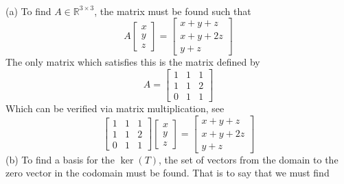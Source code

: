 \documentclass{report}
\begin{document}
\sol \\
\noindent (a) To find $A\in\mathbb{R}^{3\times3}$,  the matrix must be found such that
$$
A \begin{bmatrix} x \\ y \\ z \end{bmatrix} = \begin{bmatrix} x + y + z \\ x + y + 2z \\ y + z \end{bmatrix}
$$
The only matrix which satisfies this is the matrix defined by
$$
A = \begin{bmatrix} 
1 & 1 & 1 \\
1 & 1 & 2 \\
0 & 1 & 1
\end{bmatrix}
$$
Which can be verified via matrix multiplication,  see
$$
 \begin{bmatrix} 
1 & 1 & 1 \\
1 & 1 & 2 \\
0 & 1 & 1
\end{bmatrix}
\begin{bmatrix}
x \\ y \\ z
\end{bmatrix}
=
\begin{bmatrix}
x + y + z \\
x + y + 2z \\
y + z
\end{bmatrix}
$$
\noindent
(b) To find a basis for the $\operatorname{ker}(T)$,  the set of vectors from the domain to the zero vector in the codomain must be found.  That is to say that we must find
\end{document}
